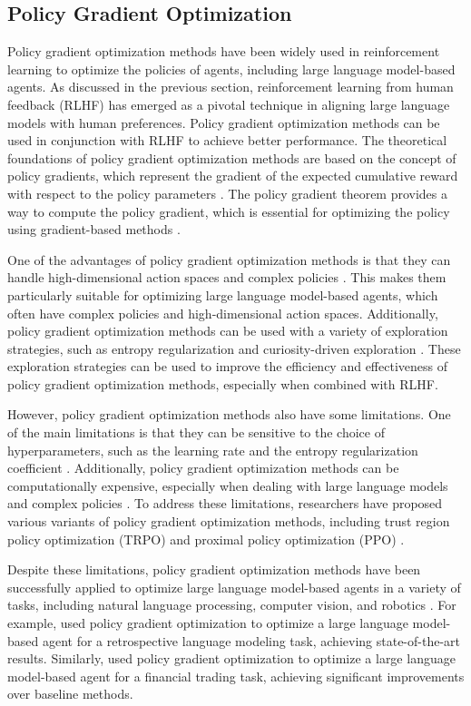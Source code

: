 \documentclass[11pt]{article}
\begin{document}
\subsection{Policy Gradient Optimization}

Policy gradient optimization methods have been widely used in reinforcement learning to optimize the policies of agents, including large language model-based agents. As discussed in the previous section, reinforcement learning from human feedback (RLHF) has emerged as a pivotal technique in aligning large language models with human preferences. Policy gradient optimization methods can be used in conjunction with RLHF to achieve better performance. The theoretical foundations of policy gradient optimization methods are based on the concept of policy gradients, which represent the gradient of the expected cumulative reward with respect to the policy parameters \cite{ref165}. The policy gradient theorem provides a way to compute the policy gradient, which is essential for optimizing the policy using gradient-based methods \cite{ref166}.

One of the advantages of policy gradient optimization methods is that they can handle high-dimensional action spaces and complex policies \cite{ref167}. This makes them particularly suitable for optimizing large language model-based agents, which often have complex policies and high-dimensional action spaces. Additionally, policy gradient optimization methods can be used with a variety of exploration strategies, such as entropy regularization and curiosity-driven exploration \cite{ref168}. These exploration strategies can be used to improve the efficiency and effectiveness of policy gradient optimization methods, especially when combined with RLHF.

However, policy gradient optimization methods also have some limitations. One of the main limitations is that they can be sensitive to the choice of hyperparameters, such as the learning rate and the entropy regularization coefficient \cite{ref169}. Additionally, policy gradient optimization methods can be computationally expensive, especially when dealing with large language models and complex policies \cite{ref170}. To address these limitations, researchers have proposed various variants of policy gradient optimization methods, including trust region policy optimization (TRPO) and proximal policy optimization (PPO) \cite{ref169}.

Despite these limitations, policy gradient optimization methods have been successfully applied to optimize large language model-based agents in a variety of tasks, including natural language processing, computer vision, and robotics \cite{ref165}. For example, \cite{ref165} used policy gradient optimization to optimize a large language model-based agent for a retrospective language modeling task, achieving state-of-the-art results. Similarly, \cite{ref171} used policy gradient optimization to optimize a large language model-based agent for a financial trading task, achieving significant improvements over baseline methods.
\end{document}

